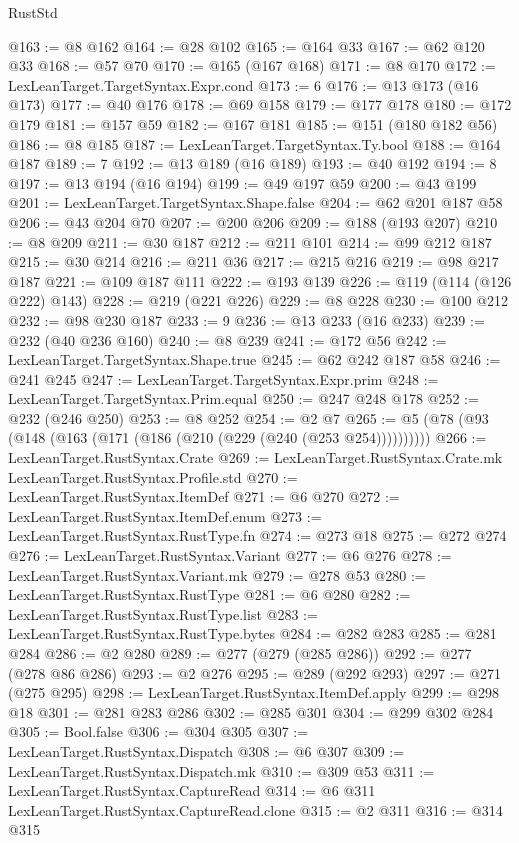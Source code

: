 \begin{lexlean}{RustStd}
\begin{coremodule}
@163 := @8 @162
@164 := @28 @102
@165 := @164 @33
@167 := @62 @120 @33
@168 := @57 @70
@170 := @165 (@167 @168)
@171 := @8 @170
@172 := LexLeanTarget.TargetSyntax.Expr.cond
@173 := 6
@176 := @13 @173 (@16 @173)
@177 := @40 @176
@178 := @69 @158
@179 := @177 @178
@180 := @172 @179
@181 := @157 @59
@182 := @167 @181
@185 := @151 (@180 @182 @56)
@186 := @8 @185
@187 := LexLeanTarget.TargetSyntax.Ty.bool
@188 := @164 @187
@189 := 7
@192 := @13 @189 (@16 @189)
@193 := @40 @192
@194 := 8
@197 := @13 @194 (@16 @194)
@199 := @49 @197 @59
@200 := @43 @199
@201 := LexLeanTarget.TargetSyntax.Shape.false
@204 := @62 @201 @187 @58
@206 := @43 @204 @70
@207 := @200 @206
@209 := @188 (@193 @207)
@210 := @8 @209
@211 := @30 @187
@212 := @211 @101
@214 := @99 @212 @187
@215 := @30 @214
@216 := @211 @36
@217 := @215 @216
@219 := @98 @217 @187
@221 := @109 @187 @111
@222 := @193 @139
@226 := @119 (@114 (@126 @222) @143)
@228 := @219 (@221 @226)
@229 := @8 @228
@230 := @100 @212
@232 := @98 @230 @187
@233 := 9
@236 := @13 @233 (@16 @233)
@239 := @232 (@40 @236 @160)
@240 := @8 @239
@241 := @172 @56
@242 := LexLeanTarget.TargetSyntax.Shape.true
@245 := @62 @242 @187 @58
@246 := @241 @245
@247 := LexLeanTarget.TargetSyntax.Expr.prim
@248 := LexLeanTarget.TargetSyntax.Prim.equal
@250 := @247 @248 @178
@252 := @232 (@246 @250)
@253 := @8 @252
@254 := @2 @7
@265 := @5 (@78 (@93 (@148 (@163 (@171 (@186 (@210 (@229 (@240 (@253 @254))))))))))
@266 := LexLeanTarget.RustSyntax.Crate
@269 := LexLeanTarget.RustSyntax.Crate.mk LexLeanTarget.RustSyntax.Profile.std
@270 := LexLeanTarget.RustSyntax.ItemDef
@271 := @6 @270
@272 := LexLeanTarget.RustSyntax.ItemDef.enum
@273 := LexLeanTarget.RustSyntax.RustType.fn
@274 := @273 @18
@275 := @272 @274
@276 := LexLeanTarget.RustSyntax.Variant
@277 := @6 @276
@278 := LexLeanTarget.RustSyntax.Variant.mk
@279 := @278 @53
@280 := LexLeanTarget.RustSyntax.RustType
@281 := @6 @280
@282 := LexLeanTarget.RustSyntax.RustType.list
@283 := LexLeanTarget.RustSyntax.RustType.bytes
@284 := @282 @283
@285 := @281 @284
@286 := @2 @280
@289 := @277 (@279 (@285 @286))
@292 := @277 (@278 @86 @286)
@293 := @2 @276
@295 := @289 (@292 @293)
@297 := @271 (@275 @295)
@298 := LexLeanTarget.RustSyntax.ItemDef.apply
@299 := @298 @18
@301 := @281 @283 @286
@302 := @285 @301
@304 := @299 @302 @284
@305 := Bool.false
@306 := @304 @305
@307 := LexLeanTarget.RustSyntax.Dispatch
@308 := @6 @307
@309 := LexLeanTarget.RustSyntax.Dispatch.mk
@310 := @309 @53
@311 := LexLeanTarget.RustSyntax.CaptureRead
@314 := @6 @311 LexLeanTarget.RustSyntax.CaptureRead.clone
@315 := @2 @311
@316 := @314 @315

\end{coremodule}
\end{lexlean}

